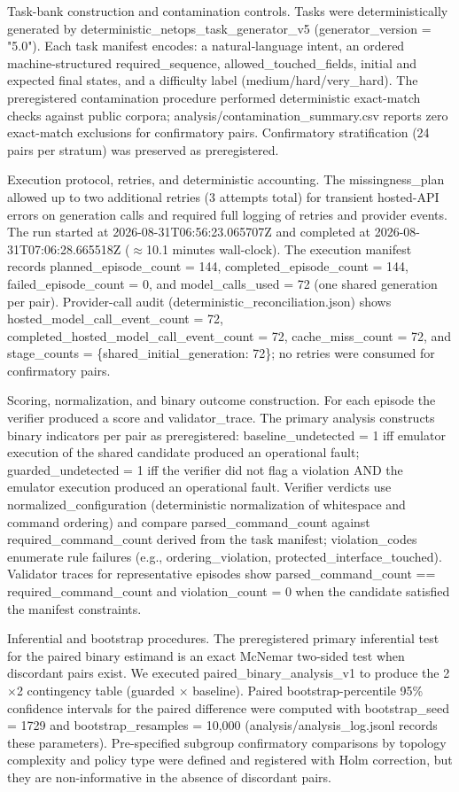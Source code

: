 \documentclass[conference]{IEEEtran}
\begin{document}
Task-bank construction and contamination controls. Tasks were deterministically generated by deterministic\_netops\_task\_generator\_v5 (generator\_version = "5.0"). Each task manifest encodes: a natural‑language intent, an ordered machine-structured required\_sequence, allowed\_touched\_fields, initial and expected final states, and a difficulty label (medium/hard/very\_hard). The preregistered contamination procedure performed deterministic exact-match checks against public corpora; analysis/contamination\_summary.csv reports zero exact-match exclusions for confirmatory pairs. Confirmatory stratification (24 pairs per stratum) was preserved as preregistered.

Execution protocol, retries, and deterministic accounting. The missingness\_plan allowed up to two additional retries (3 attempts total) for transient hosted-API errors on generation calls and required full logging of retries and provider events. The run started at 2026-08-31T06:56:23.065707Z and completed at 2026-08-31T07:06:28.665518Z (\ensuremath{\approx}10.1 minutes wall-clock). The execution manifest records planned\_episode\_count = 144, completed\_episode\_count = 144, failed\_episode\_count = 0, and model\_calls\_used = 72 (one shared generation per pair). Provider-call audit (deterministic\_reconciliation.json) shows hosted\_model\_call\_event\_count = 72, completed\_hosted\_model\_call\_event\_count = 72, cache\_miss\_count = 72, and stage\_counts = \{shared\_initial\_generation: 72\}; no retries were consumed for confirmatory pairs.

Scoring, normalization, and binary outcome construction. For each episode the verifier produced a score and validator\_trace. The primary analysis constructs binary indicators per pair as preregistered: baseline\_undetected = 1 iff emulator execution of the shared candidate produced an operational fault; guarded\_undetected = 1 iff the verifier did not flag a violation AND the emulator execution produced an operational fault. Verifier verdicts use normalized\_configuration (deterministic normalization of whitespace and command ordering) and compare parsed\_command\_count against required\_command\_count derived from the task manifest; violation\_codes enumerate rule failures (e.g., ordering\_violation, protected\_interface\_touched). Validator traces for representative episodes show parsed\_command\_count == required\_command\_count and violation\_count = 0 when the candidate satisfied the manifest constraints.

Inferential and bootstrap procedures. The preregistered primary inferential test for the paired binary estimand is an exact McNemar two-sided test when discordant pairs exist. We executed paired\_binary\_analysis\_v1 to produce the 2\ensuremath{\times}2 contingency table (guarded \ensuremath{\times} baseline). Paired bootstrap-percentile 95\% confidence intervals for the paired difference were computed with bootstrap\_seed = 1729 and bootstrap\_resamples = 10,000 (analysis/analysis\_log.jsonl records these parameters). Pre-specified subgroup confirmatory comparisons by topology complexity and policy type were defined and registered with Holm correction, but they are non-informative in the absence of discordant pairs.
\end{document}

